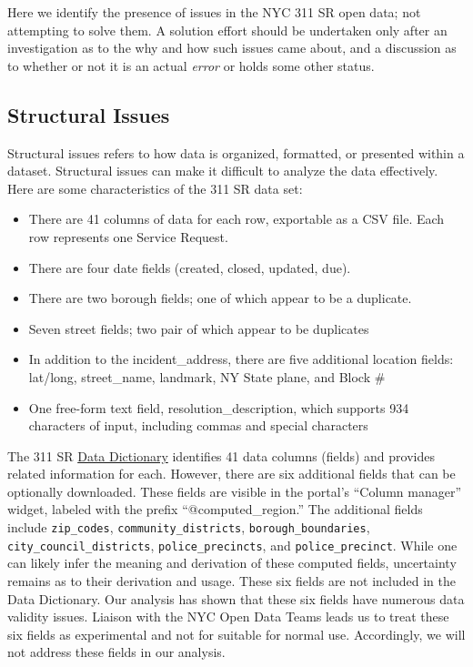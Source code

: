 \documentclass[linenumber]{jdsart}
\begin{document}
Here we identify the presence of issues in the NYC 311 SR open data;
not attempting to solve them. A solution effort should
be undertaken only after an investigation as to the why and how 
such issues came about, and a discussion as to whether or not it 
is an actual \textit{error} or holds some other status.


\subsection{Structural Issues}
\label{sec:structural}

Structural issues refers to how data is organized, formatted, 
or presented within a dataset. Structural issues can make 
it difficult to analyze the data effectively. Here are some 
characteristics of the 311 SR data set:

\begin{itemize}
	\item There are 41 columns of data for each row, exportable as a CSV file.
	Each row represents one Service Request. 
	
	\item There are four date fields (created, closed, updated, due).
	
	\item There are two borough fields; one of which appear to be a duplicate.
		
	\item Seven street fields; two pair of which appear to be duplicates
	
	\item In addition to the incident\_address, there are five additional location fields: 
	lat/long, street\_name, landmark, NY State plane, and Block \#
	
	\item One free-form text field, resolution\_description, which 
	supports 934 characters of input, including commas and special characters
\end{itemize}

The 311 SR 
\href{https://data.cityofnewyork.us/api/views/erm2-nwe9/files/b372b884-f86a-453b-ba16-1fe06ce9d212?download=true&filename=311_ServiceRequest_2010-Present_DataDictionary_Updated_2023.xlsx}{Data Dictionary} 
identifies 41 data columns (fields) and provides related information 
for each. However, there are six additional fields that can be
optionally downloaded. These fields are 
visible in the portal's ``Column manager'' widget, labeled with the prefix 
``@computed\_region.'' The additional fields include \texttt{zip\_codes}, 
\texttt{community\_districts}, \texttt{borough\_boundaries}, 
\texttt{city\_council\_districts}, \texttt{police\_precincts}, and 
\texttt{police\_precinct}. While one can likely infer the meaning and 
derivation of these computed fields, uncertainty remains as to
their derivation and usage. These six fields are not included in
the Data Dictionary. Our analysis has shown that these six 
fields have numerous data validity issues. Liaison with the 
NYC Open Data Teams leads us to treat these six fields 
as experimental and not for suitable for normal use. Accordingly, 
we will not address these fields in our analysis.
\end{document}
